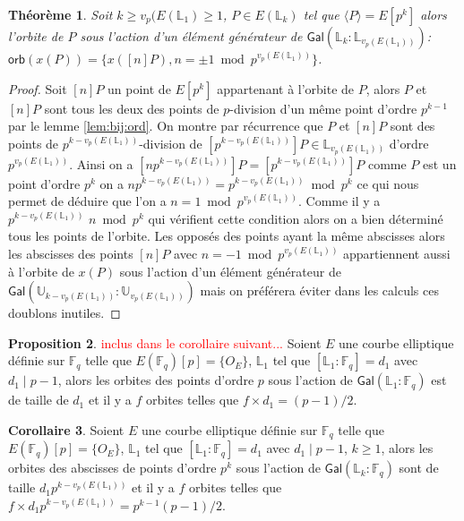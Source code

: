 \documentclass[10pt,a4paper]{book}
\theoremstyle{plain}
\newtheorem{thm}{Théorème}[chapter]
\theoremstyle{definition}
\theoremstyle{definition}
\newtheorem{cor}[thm]{Corollaire}
\theoremstyle{definition}
\newtheorem{prop}[thm]{Proposition}
\theoremstyle{definition}
\theoremstyle{remark}
\theoremstyle{remark}
\theoremstyle{definition}
\begin{document}
\begin{thm}
\label{thm:orb:fro}
Soit $k\geqslant  v_p({E(\mathbb{L}_1)} \geqslant 1$,
 $P \in E(\mathbb{L}_{k})$ tel que $\langle P \rangle =E[p^k]$ 
 alors l'orbite de $P$ sous l'action d'un élément générateur
  de $\mathsf{Gal}(\mathbb{L}_{k}:\mathbb{L}_{v_p({E(\mathbb{L}_1)})})$:
   $\mathsf{orb}(x(P))=
   \{ x([n]P) , 
   n= \pm 1 \bmod p^{v_p({E(\mathbb{L}_1)})} \}$. 
\end{thm}

\begin{proof}
Soit $[n]P$ un point de $E[p^k]$ appartenant à l'orbite de $P$, alors $P$ et $[n]P$ sont tous les deux des points de $p$-division d'un même point d'ordre $p^{k-1}$ par le lemme \ref{lem:bij:ord}. On montre par récurrence que $P$ et $[n]P$ sont des points de $p^{k-v_p({E(\mathbb{L}_1)})}$-division de $[p^{k-v_p({E(\mathbb{L}_1)})}]P \in \mathbb{L}_{v_p({E(\mathbb{L}_1)})}$ d'ordre $p^{v_p(E(\mathbb{L}_1))}$. Ainsi on a $[np^{k-v_p(E(\mathbb{L}_1))}]P=[p^{k-v_p(E(\mathbb{L}_1))}]P$ comme $P$ est un point d'ordre $p^k$ on a $np^{k-v_p(E(\mathbb{L}_1))}=p^{k-v_p(E(\mathbb{L}_1))} \bmod p^k$ ce qui nous permet de déduire que l'on a $n=1 \bmod p^{v_p(E(\mathbb{L}_1))}$. Comme il y a $p^{k-v_p(E(\mathbb{L}_1))}$ $n \bmod p^k$ qui vérifient cette condition alors on a bien déterminé tous les points de l'orbite. Les opposés des points ayant la même abscisses alors les abscisses des points $[n]P$ avec $n=-1 \bmod p^{v_p(E(\mathbb{L}_1))}$ appartiennent aussi à l'orbite de $x(P)$ sous l'action d'un élément générateur de $\mathsf{Gal}(\mathbb{U}_{k-v_p(E(\mathbb{L}_1))}:\mathbb{U}_{v_p(E(\mathbb{L}_1))})$ mais on préférera éviter dans les calculs ces doublons inutiles.
\end{proof}

\begin{prop}
\textcolor{red}{inclus dans le corollaire suivant...}
Soient $E$ une courbe elliptique définie sur $\mathbb{F}_q$ telle que $E(\mathbb{F}_q)[p]=\{O_E\}$, $\mathbb{L}_1$ tel que $[\mathbb{L}_1:\mathbb{F}_q]=d_1$ avec $d_1 \mid p-1$, alors les orbites des points d'ordre $p$ sous l'action de $\mathsf{Gal}(\mathbb{L}_1:\mathbb{F}_q)$ est de taille de $d_1 $ et il y a $f$ orbites telles que $f \times d_1  = (p-1)/2$.
\end{prop}


\begin{cor}
Soient $E$ une courbe elliptique définie sur $\mathbb{F}_q$ telle que $E(\mathbb{F}_q)[p]=\{O_E\}$, $\mathbb{L}_1$ tel que $[\mathbb{L}_1:\mathbb{F}_q]=d_1$ avec $d_1 \mid p-1$, $k \geqslant 1$, alors les orbites des abscisses de points d'ordre $p^k$ sous l'action de $\mathsf{Gal}(\mathbb{L}_{k}:\mathbb{F}_q)$ sont de taille $d_1 p^{k-v_p(E(\mathbb{L}_1))}$ et il y a $f$ orbites telles que $f \times d_1 p^{k-v_p(E(\mathbb{L}_1))} = p^{k-1}(p-1)/2$.
\end{cor}
\end{document}
